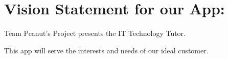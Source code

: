\section{Vision Statement for our App:}

Team Peanut's Project presents the IT Technology Tutor.

This app will serve the interests and needs of our ideal customer.





